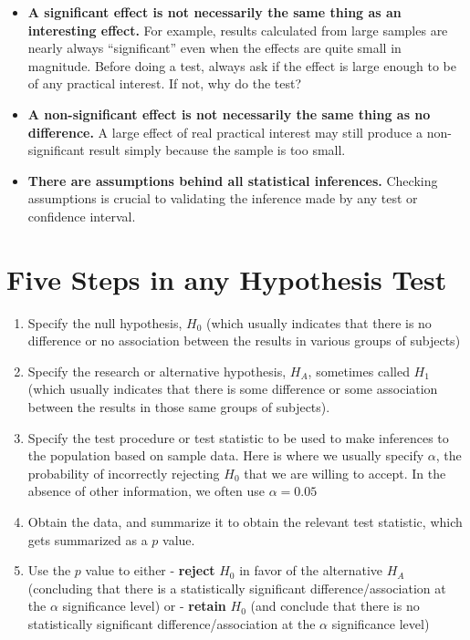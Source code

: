 \documentclass[
]{book}
\providecommand{\tightlist}{%
  \setlength{\itemsep}{0pt}\setlength{\parskip}{0pt}}
\begin{document}
\begin{itemize}
\item
  \textbf{A significant effect is not necessarily the same thing as an interesting effect.} For example, results calculated from large samples are nearly always ``significant'' even when the effects are quite small in magnitude. Before doing a test, always ask if the effect is large enough to be of any practical interest. If not, why do the test?
\item
  \textbf{A non-significant effect is not necessarily the same thing as no difference.} A large effect of real practical interest may still produce a non-significant result simply because the sample is too small.
\item
  \textbf{There are assumptions behind all statistical inferences.} Checking assumptions is crucial to validating the inference made by any test or confidence interval.
\end{itemize}

\hypertarget{five-steps-in-any-hypothesis-test}{%
\section{Five Steps in any Hypothesis Test}\label{five-steps-in-any-hypothesis-test}}

\begin{enumerate}
\def\labelenumi{\arabic{enumi}.}
\tightlist
\item
  Specify the null hypothesis, \(H_0\) (which usually indicates that there is no difference or no association between the results in various groups of subjects)
\item
  Specify the research or alternative hypothesis, \(H_A\), sometimes called \(H_1\) (which usually indicates that there is some difference or some association between the results in those same groups of subjects).
\item
  Specify the test procedure or test statistic to be used to make inferences to the population based on sample data. Here is where we usually specify \(\alpha\), the probability of incorrectly rejecting \(H_0\) that we are willing to accept. In the absence of other information, we often use \(\alpha = 0.05\)
\item
  Obtain the data, and summarize it to obtain the relevant test statistic, which gets summarized as a \(p\) value.
\item
  Use the \(p\) value to either
  - \textbf{reject} \(H_0\) in favor of the alternative \(H_A\) (concluding that there is a statistically significant difference/association at the \(\alpha\) significance level) or
  - \textbf{retain} \(H_0\) (and conclude that there is no statistically significant difference/association at the \(\alpha\) significance level)
\end{enumerate}
\end{document}
